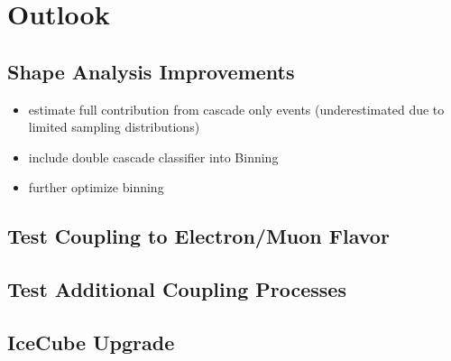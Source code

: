 
\section{Outlook}

\subsection{Shape Analysis Improvements}

\begin{itemize}
    \item estimate full contribution from cascade only events (underestimated due to limited sampling distributions)
    \item include double cascade classifier into Binning
    \item further optimize binning
\end{itemize}

\subsection{Test Coupling to Electron/Muon Flavor}

\subsection{Test Additional Coupling Processes}

\subsection{IceCube Upgrade}
